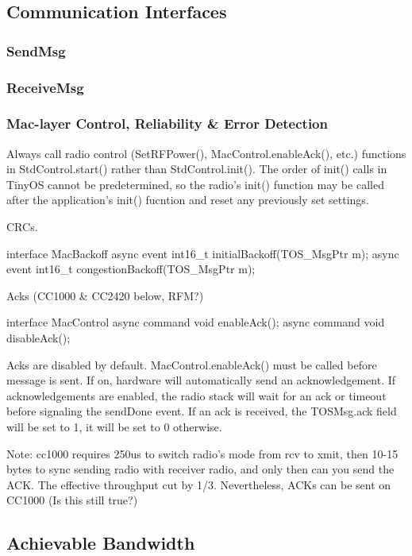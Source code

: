 \subsection{Communication Interfaces}
\subsubsection{SendMsg}
\subsubsection{ReceiveMsg}

\subsubsection{Mac-layer Control, Reliability & Error Detection}

Always call radio control (SetRFPower(), MacControl.enableAck(), etc.)
functions in StdControl.start() rather than StdControl.init().  The
order of init() calls in TinyOS cannot be predetermined, so the radio's init()
function may be called after the application's init() fucntion and
reset any previously set settings.

CRCs.

interface MacBackoff
{
  async event int16_t initialBackoff(TOS_MsgPtr m);
  async event int16_t congestionBackoff(TOS_MsgPtr m);
}

Acks (CC1000 & CC2420 below, RFM?)

interface MacControl
{
  async command void enableAck();
  async command void disableAck();
}

Acks are disabled by default. MacControl.enableAck() must be called
before message is sent. If on, hardware will automatically send an
acknowledgement.  If acknowledgements are enabled, the radio stack
will wait for an ack or timeout before signaling the sendDone event.
If an ack is received, the TOSMsg.ack field will be set to 1, it will
be set to 0 otherwise.

Note: cc1000 requires 250us to switch radio's mode from rcv to xmit,
then 10-15 bytes to sync sending radio with receiver radio, and only
then can you send the ACK. The effective throughput cut by
1/3. Nevertheless, ACKs can be sent on CC1000 (Is this still true?)

\subsection{Achievable Bandwidth}

